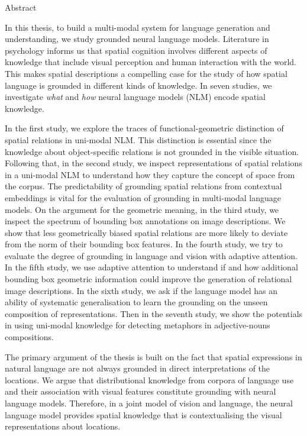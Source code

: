 {Abstract}
\label{sec:abstract:abstract}

In this thesis, to build a multi-modal system for language generation and understanding, we study grounded neural language models. 
Literature in psychology informs us that spatial cognition involves different aspects of knowledge that include visual perception and human interaction with the world. This makes spatial descriptions a compelling case for the study of how spatial language is grounded in different kinds of knowledge.
In seven studies, we investigate \emph{what} and \emph{how} neural language models (NLM) encode spatial knowledge. 

In the first study, we explore the traces of functional-geometric distinction of spatial relations in uni-modal NLM.
This distinction is essential since the knowledge about object-specific relations is not grounded in the visible situation. 
Following that, in the second study, we inspect representations of spatial relations in a uni-modal NLM to understand how they capture the concept of space from the corpus.
The predictability of grounding spatial relations from contextual embeddings is vital for the evaluation of grounding in multi-modal language models.
On the argument for the geometric meaning, in the third study, we inspect the spectrum of bounding box annotations on image descriptions. 
We show that less geometrically biased spatial relations are more likely to deviate from the norm of their bounding box features.
In the fourth study, we try to evaluate the degree of grounding in language and vision with adaptive attention.
In the fifth study, we use adaptive attention to understand if and how additional bounding box geometric information could improve the generation of relational image descriptions. 
In the sixth study, we ask if the language model has an ability of systematic generalisation to learn the grounding on the unseen composition of representations.
Then in the seventh study, we show the potentials in using uni-modal knowledge for detecting metaphors in adjective-nouns compositions.

The primary argument of the thesis is built on the fact that spatial expressions in natural language are not always grounded in direct interpretations of the locations. 
We argue that distributional knowledge from corpora of language use and their association with visual features constitute grounding with neural language models. 
Therefore, in a joint model of vision and language, the neural language model provides spatial knowledge that is contextualising the visual representations about locations. 





